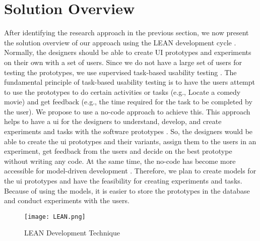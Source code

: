 \clearpage
\section{Solution Overview}
\label{introduction:section:solution}
After identifying the research approach in the previous section, we now present the solution overview of our approach using the LEAN development cycle \cite{misc:lean:toyota}.
Normally, the designers should be able to create UI prototypes and experiments on their own with a set of users.
Since we do not have a large set of users for testing the prototypes, we use supervised task-based usability testing \cite{article:dataanalysis:supervisedtest}.
The fundamental principle of task-based usability testing is to have the users attempt to use the prototypes to do certain activities or tasks (e.g., Locate a comedy movie) and get feedback (e.g., the time required for the task to be completed by the user).
We propose to use a no-code approach to achieve this.
This approach helps to have a \ac{ui} for the designers to understand, develop, and create experiments and tasks with the software prototypes \cite{paper:lowcode:khorram}.
So, the designers would be able to create the \ac{ui} prototypes and their variants, assign them to the users in an experiment, get feedback from the users and decide on the best prototype without writing any code.
At the same time, the no-code has become more accessible for model-driven development \cite{article:lowcode:modeldriven}.
Therefore, we plan to create models for the \ac{ui} prototypes and have the feasibility for creating experiments and tasks. 
Because of using the models, it is easier to store the prototypes in the database and conduct experiments with the users. 
\begin{figure}[ht]
    \centering
    \texttt{[image: LEAN.png]}
    \caption{LEAN Development Technique}
    \label{intro:fig:lean}
\end{figure}

